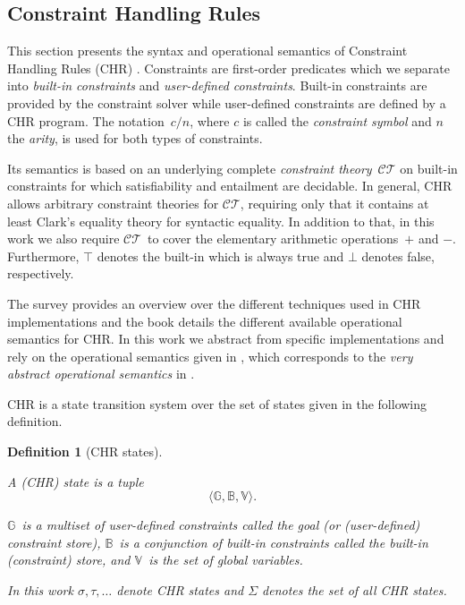 \documentclass{tlp}
\newtheorem{definition}{Definition}[section]
\newcommand{\st}[3]{\ensuremath{\langle #1 , #2 , #3 \rangle}}
\newcommand{\CT}{\ensuremath{\mathcal{CT}}}
\newcommand{\bbB}{\ensuremath{\mathbb{B}}}
\newcommand{\bbG}{\ensuremath{\mathbb{G}}}
\newcommand{\bbV}{\ensuremath{\mathbb{V}}}
\begin{document}
\subsection{Constraint Handling Rules}
\label{sec:prelim:chr}
This section presents the syntax and operational semantics of Constraint Handling
Rules (CHR) \cite{chr_survey_tplp08,fruehwirth09}. Constraints are first-order
predicates which we separate into \emph{built-in constraints} and
\emph{user-defined constraints}. Built-in constraints are provided by the
constraint solver while user-defined constraints are defined by a CHR program.
The notation~$c/n$, where $c$ is called the \emph{constraint symbol} and $n$ the
\emph{arity}, is used for both types of constraints.

Its semantics is based on an underlying complete \emph{constraint theory}~$\CT$
on built-in constraints for which satisfiability and entailment are decidable. In
general, CHR allows arbitrary constraint theories for \CT, requiring only that it
contains at least Clark's equality theory for syntactic equality. In addition to
that, in this work we also require \CT\ to cover the elementary arithmetic
operations~${+}$ and ${-}$. Furthermore, $\top$ denotes the built-in which is
always true and $\bot$ denotes false, respectively.

The survey \cite{chr_survey_tplp08} provides an overview over the different
techniques used in CHR implementations and the book \cite{fruehwirth09} details
the different available operational semantics for CHR. In this work we abstract
from specific implementations and rely on the operational semantics given in
\cite{Raiser2009a}, which corresponds to the \emph{very abstract operational
semantics} in \cite{fruehwirth09}.

CHR is a state transition system over the set of states given in the following
definition.

\begin{definition}[CHR states] 
\label{def:states}

A \emph{(CHR) state} is a tuple \[\st{\bbG}{\bbB}{\bbV}.\]

\bbG\ is a multiset of user-defined constraints called the \emph{goal} (or
\emph{(user-defined) constraint store}), \bbB\ is a conjunction of built-in
constraints called the \emph{built-in (constraint) store}, and \bbV\ is the set
of \emph{global variables}.

In this work $\sigma, \tau, \ldots$ denote CHR states and $\Sigma$ denotes the
set of all CHR states.
\end{definition}
\end{document}
